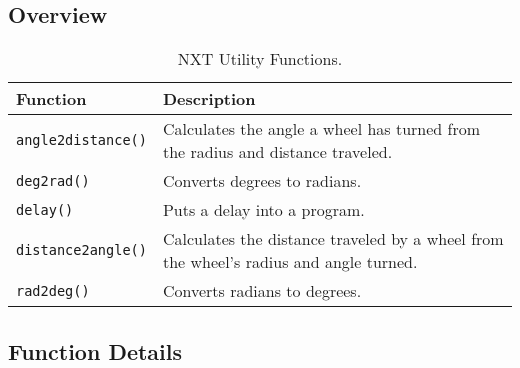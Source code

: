 \subsection{Overview}
\begin{table}[H]
\begin{center}
\caption{NXT Utility Functions.}
\begin{tabular}{p{38 mm}p{110 mm}}
\hline
Function & Description \\
\hline
\texttt{angle2distance()} & Calculates the angle a wheel has turned from the
radius and distance traveled.\\
\texttt{deg2rad()} & Converts degrees to radians. \\
\texttt{delay()} & Puts a delay into a program. \\
\texttt{distance2angle()} & Calculates the distance traveled by a wheel from the wheel's radius and angle turned.\\
\texttt{rad2deg()} & Converts radians to degrees.\\
\hline
\end{tabular}
\end{center}
\label{mobilec_api_cbinary}
\end{table}

\subsection{Function Details}



%

\clearpage
\newpage

%
